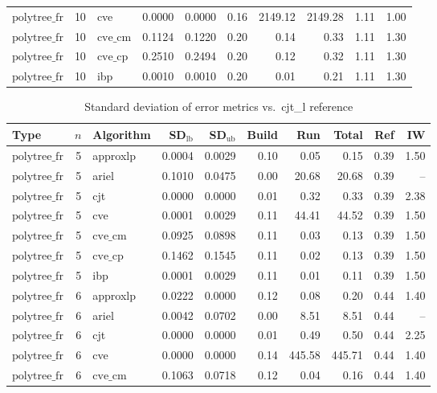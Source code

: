 \begin{table}[ht]
\begin{tabular}{lrlrrrrrrr}
$\text{polytree\_fr}$ & 10 & cve & 0.0000 & 0.0000 & 0.16 & 2149.12 & 2149.28 & 1.11 & 1.00 \\
$\text{polytree\_fr}$ & 10 & $\text{cve\_cm}$ & 0.1124 & 0.1220 & 0.20 & 0.14 & 0.33 & 1.11 & 1.30 \\
$\text{polytree\_fr}$ & 10 & $\text{cve\_cp}$ & 0.2510 & 0.2494 & 0.20 & 0.12 & 0.32 & 1.11 & 1.30 \\
$\text{polytree\_fr}$ & 10 & ibp & 0.0010 & 0.0010 & 0.20 & 0.01 & 0.21 & 1.11 & 1.30 \\
\bottomrule
\end{tabular}
\end{table}

\begin{table}[ht]
\centering
\scriptsize
\caption{Standard deviation of error metrics vs.\ cjt_l reference}
\begin{tabular}{lrlrrrrrrr}
\toprule
Type & $n$ & Algorithm & SD$_{\text{lb}}$ & SD$_{\text{ub}}$ & Build & Run & Total & Ref & IW \\
\midrule
$\text{polytree\_fr}$ & 5 & approxlp & 0.0004 & 0.0029 & 0.10 & 0.05 & 0.15 & 0.39 & 1.50 \\
$\text{polytree\_fr}$ & 5 & ariel & 0.1010 & 0.0475 & 0.00 & 20.68 & 20.68 & 0.39 & -- \\
$\text{polytree\_fr}$ & 5 & cjt & 0.0000 & 0.0000 & 0.01 & 0.32 & 0.33 & 0.39 & 2.38 \\
$\text{polytree\_fr}$ & 5 & cve & 0.0001 & 0.0029 & 0.11 & 44.41 & 44.52 & 0.39 & 1.50 \\
$\text{polytree\_fr}$ & 5 & $\text{cve\_cm}$ & 0.0925 & 0.0898 & 0.11 & 0.03 & 0.13 & 0.39 & 1.50 \\
$\text{polytree\_fr}$ & 5 & $\text{cve\_cp}$ & 0.1462 & 0.1545 & 0.11 & 0.02 & 0.13 & 0.39 & 1.50 \\
$\text{polytree\_fr}$ & 5 & ibp & 0.0001 & 0.0029 & 0.11 & 0.01 & 0.11 & 0.39 & 1.50 \\
$\text{polytree\_fr}$ & 6 & approxlp & 0.0222 & 0.0000 & 0.12 & 0.08 & 0.20 & 0.44 & 1.40 \\
$\text{polytree\_fr}$ & 6 & ariel & 0.0042 & 0.0702 & 0.00 & 8.51 & 8.51 & 0.44 & -- \\
$\text{polytree\_fr}$ & 6 & cjt & 0.0000 & 0.0000 & 0.01 & 0.49 & 0.50 & 0.44 & 2.25 \\
$\text{polytree\_fr}$ & 6 & cve & 0.0000 & 0.0000 & 0.14 & 445.58 & 445.71 & 0.44 & 1.40 \\
$\text{polytree\_fr}$ & 6 & $\text{cve\_cm}$ & 0.1063 & 0.0718 & 0.12 & 0.04 & 0.16 & 0.44 & 1.40 \\

\end{tabular}
\end{table}
